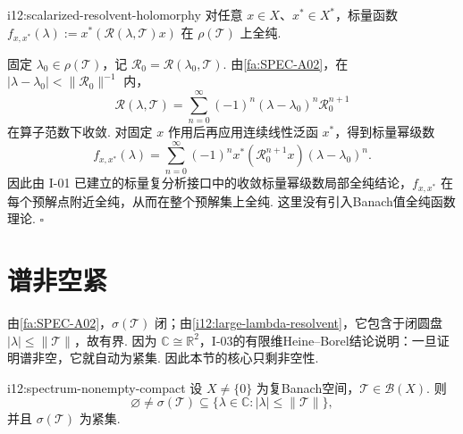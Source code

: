 \begin{FAProposition}[C][标量化预解的全纯性]{i12:scalarized-resolvent-holomorphy}
对任意 \(\displaystyle x\in X\)、\(\displaystyle x^*\in X^*\)，标量函数
\(\displaystyle f_{x,x^*}(\lambda) := x^*(\mathcal R(\lambda,\mathcal T)x)\)
在 \(\displaystyle \rho(\mathcal T)\) 上全纯.
\end{FAProposition}

\begin{FAProof}
固定 \(\displaystyle \lambda_0\in\rho(\mathcal T)\)，记 \(\displaystyle \mathcal R_0=\mathcal R(\lambda_0,\mathcal T)\). 由\autoref{fa:SPEC-A02}，在 \(\displaystyle |\lambda-\lambda_0|<\|\mathcal R_0\|^{-1}\) 内，
\[
\mathcal R(\lambda,\mathcal T)
=
\sum_{n=0}^{\infty}
(-1)^n(\lambda-\lambda_0)^n\mathcal R_0^{n+1}
\]
在算子范数下收敛. 对固定 \(\displaystyle x\) 作用后再应用连续线性泛函 \(\displaystyle x^*\)，得到标量幂级数
\[
f_{x,x^*}(\lambda)
=
\sum_{n=0}^{\infty}
(-1)^n
x^*(\mathcal R_0^{n+1}x)
(\lambda-\lambda_0)^n.
\]
因此由 I-01 已建立的标量复分析接口中的收敛标量幂级数局部全纯结论，\(\displaystyle f_{x,x^*}\) 在每个预解点附近全纯，从而在整个预解集上全纯. 这里没有引入Banach值全纯函数理论.
\hfill\(\square\)
\end{FAProof}

\section{谱非空紧}\label{sec:i12-spectrum-compact}

由\autoref{fa:SPEC-A02}，\(\displaystyle \sigma(\mathcal T)\) 闭；由\autoref{i12:large-lambda-resolvent}，它包含于闭圆盘 \(\displaystyle |\lambda|\leqslant\|\mathcal T\|\)，故有界. 因为 \(\displaystyle \mathbb C\cong\mathbb R^2\)，I-03的有限维Heine--Borel结论说明：一旦证明谱非空，它就自动为紧集. 因此本节的核心只剩非空性.

\begin{FAProposition}[A][复Banach算子的谱非空紧]{i12:spectrum-nonempty-compact}
设 \(\displaystyle X\neq\{0\}\) 为复Banach空间，\(\displaystyle \mathcal T\in\mathcal B(X)\). 则
\[
\varnothing
\neq
\sigma(\mathcal T)
\subseteq
\{\lambda\in\mathbb C:|\lambda|\leqslant\|\mathcal T\|\},
\]
并且 \(\displaystyle \sigma(\mathcal T)\) 为紧集.
\end{FAProposition}

